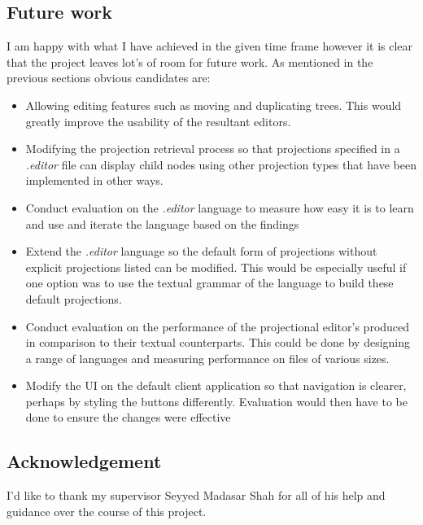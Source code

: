 \documentclass{article}
\begin{document}
\subsection{Future work}\label{futureWork}
I am happy with what I have achieved in the given time frame however it is clear that the project leaves lot's of room for future work. As mentioned in the previous sections obvious candidates are:
\begin{itemize}
\item Allowing editing features such as moving and duplicating trees. This would greatly improve the usability of the resultant editors. 
\item Modifying the projection retrieval process so that projections specified in a \emph{.editor} file can display child nodes using other projection types that have been implemented in other ways.
\item Conduct evaluation on the \emph{.editor} language to measure how easy it is to learn and use and iterate the language based on the findings
\item Extend the \emph{.editor} language so the default form of projections without explicit projections listed can be modified. This would be especially useful if one option was to use the textual grammar of the language to build these default projections.
\item Conduct evaluation on the performance of the projectional editor's produced in comparison to their textual counterparts. This could be done by designing a range of languages and measuring performance on files of various sizes.
\item Modify the UI on the default client application so that navigation is clearer, perhaps by styling the buttons differently. Evaluation would then have to be done to ensure the changes were effective
\end{itemize}
\subsection{Acknowledgement}
I'd like to thank my supervisor Seyyed Madasar Shah for all of his help and guidance over the course of this project.

\begin{appendices}

\end{appendices}
\printbibliography
\end{document}
